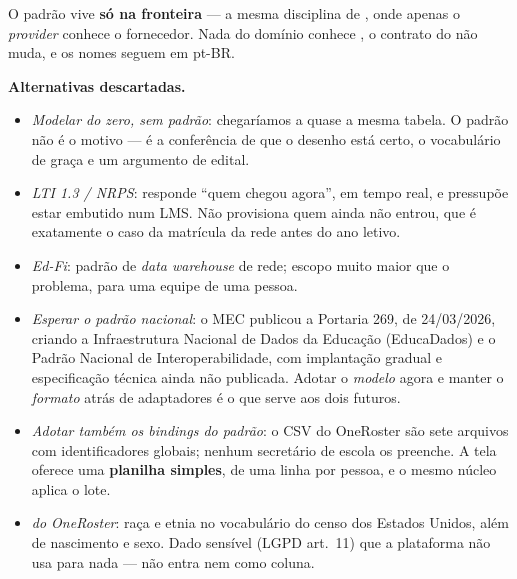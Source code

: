 O padrão vive \textbf{só na fronteira}  --- a mesma
disciplina de , onde apenas o \emph{provider} conhece o fornecedor.
Nada do domínio conhece , o contrato do  não muda, e os
nomes seguem em pt-BR.

\textbf{Alternativas descartadas.}
\begin{itemize}
  \item \emph{Modelar do zero, sem padrão}: chegaríamos a quase a mesma tabela.
    O padrão não é o motivo --- é a conferência de que o desenho está certo, o
    vocabulário de graça e um argumento de edital.
  \item \emph{LTI 1.3 / NRPS}: responde \enquote{quem chegou agora}, em tempo real,
    e pressupõe estar embutido num LMS. Não provisiona quem ainda não entrou, que
    é exatamente o caso da matrícula da rede antes do ano letivo.
  \item \emph{Ed-Fi}: padrão de \emph{data warehouse} de rede; escopo muito maior
    que o problema, para uma equipe de uma pessoa.
  \item \emph{Esperar o padrão nacional}: o MEC publicou a Portaria 269, de
    24/03/2026, criando a Infraestrutura Nacional de Dados da Educação
    (EducaDados) e o Padrão Nacional de Interoperabilidade, com implantação
    gradual e especificação técnica ainda não publicada. Adotar o \emph{modelo}
    agora e manter o \emph{formato} atrás de adaptadores é o que serve aos dois
    futuros.
  \item \emph{Adotar também os \emph{bindings} do padrão}: o CSV do OneRoster são
    sete arquivos com identificadores globais; nenhum secretário de escola os
    preenche. A tela oferece uma \textbf{planilha simples}, de uma linha por
    pessoa, e o mesmo núcleo aplica o lote.
  \item \emph{ do OneRoster}: raça e etnia no vocabulário do
    censo dos Estados Unidos, além de nascimento e sexo. Dado sensível
    (LGPD art.~11) que a plataforma não usa para nada --- não entra nem como
    coluna.
\end{itemize}

